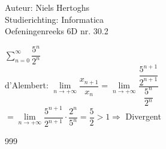 \documentclass[a4paper]{article}
\begin{document}
\noindent \large Auteur: Niels Hertoghs \\
\noindent \large Studierichting:  Informatica\\
\noindent \large Oefeningenreeks 6D nr. 30.2\\


\medskip

\normalsize

$\displaystyle\sum\limits_{n=0}^{\infty} \dfrac{5^n}{2^n}$\\

d'Alembert: $\lim\limits_{n \rightarrow +\infty} \dfrac{x_{n+1}}{x_n} = \lim\limits_{n \rightarrow +\infty} \dfrac{\dfrac{5^{n+1}}{2^{n+1}}}{\dfrac{5^n}{2^n}}$\\

$=  \lim\limits_{n \rightarrow +\infty} \dfrac{5^{n+1}}{2^{n+1}} \cdot \dfrac{2^n}{5^n} = \dfrac{5}{2} > 1\Rightarrow $ Divergent
	
	
	
	
	\begin{thebibliography}{999}
	\end{thebibliography}
\end{document}
